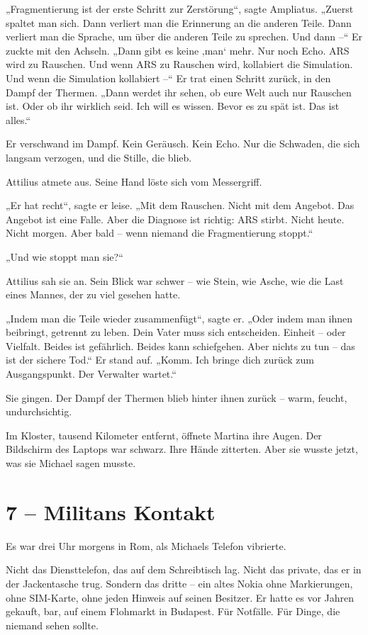 \documentclass[
]{article}
\begin{document}
„Fragmentierung ist der erste Schritt zur Zerstörung``, sagte Ampliatus. „Zuerst spaltet man sich. Dann verliert man die Erinnerung an die anderen Teile. Dann verliert man die Sprache, um über die anderen Teile zu sprechen. Und dann --`` Er zuckte mit den Achseln. „Dann gibt es keine ‚man` mehr. Nur noch Echo. ARS wird zu Rauschen. Und wenn ARS zu Rauschen wird, kollabiert die Simulation. Und wenn die Simulation kollabiert --`` Er trat einen Schritt zurück, in den Dampf der Thermen. „Dann werdet ihr sehen, ob eure Welt auch nur Rauschen ist. Oder ob ihr wirklich seid. Ich will es wissen. Bevor es zu spät ist. Das ist alles.``

Er verschwand im Dampf. Kein Geräusch. Kein Echo. Nur die Schwaden, die sich langsam verzogen, und die Stille, die blieb.

Attilius atmete aus. Seine Hand löste sich vom Messergriff.

„Er hat recht``, sagte er leise. „Mit dem Rauschen. Nicht mit dem Angebot. Das Angebot ist eine Falle. Aber die Diagnose ist richtig: ARS stirbt. Nicht heute. Nicht morgen. Aber bald -- wenn niemand die Fragmentierung stoppt.``

„Und wie stoppt man sie?{\kern0pt}``

Attilius sah sie an. Sein Blick war schwer -- wie Stein, wie Asche, wie die Last eines Mannes, der zu viel gesehen hatte.

„Indem man die Teile wieder zusammenfügt``, sagte er. „Oder indem man ihnen beibringt, getrennt zu leben. Dein Vater muss sich entscheiden. Einheit -- oder Vielfalt. Beides ist gefährlich. Beides kann schiefgehen. Aber nichts zu tun -- das ist der sichere Tod.`` Er stand auf. „Komm. Ich bringe dich zurück zum Ausgangspunkt. Der Verwalter wartet.``

Sie gingen. Der Dampf der Thermen blieb hinter ihnen zurück -- warm, feucht, undurchsichtig.

Im Kloster, tausend Kilometer entfernt, öffnete Martina ihre Augen. Der Bildschirm des Laptops war schwarz. Ihre Hände zitterten. Aber sie wusste jetzt, was sie Michael sagen musste.

\section{7 -- Militans\textquotesingle{} Kontakt}\label{militans-kontakt}

Es war drei Uhr morgens in Rom, als Michaels Telefon vibrierte.

Nicht das Diensttelefon, das auf dem Schreibtisch lag. Nicht das private, das er in der Jackentasche trug. Sondern das dritte -- ein altes Nokia ohne Markierungen, ohne SIM-Karte, ohne jeden Hinweis auf seinen Besitzer. Er hatte es vor Jahren gekauft, bar, auf einem Flohmarkt in Budapest. Für Notfälle. Für Dinge, die niemand sehen sollte.
\end{document}
